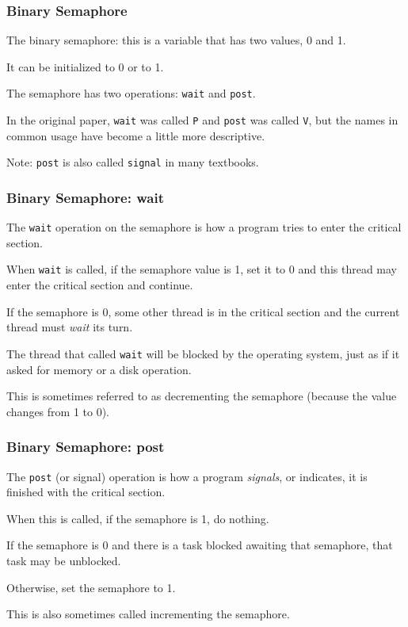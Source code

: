 \begin{frame}
	\frametitle{Binary Semaphore}

	The \alert{binary semaphore}: this is a variable that has two values, 0 and 1.

	It can be initialized to 0 or to 1.

	The semaphore has two operations: \texttt{wait} and \texttt{post}.

	In the original paper, \texttt{wait} was called \texttt{P} and \texttt{post} was called \texttt{V}, but the names in common usage have become a little more descriptive.

	Note: \texttt{post} is also called \texttt{signal} in many textbooks.


\end{frame}

\begin{frame}
	\frametitle{Binary Semaphore: wait}

	The \texttt{wait} operation on the semaphore is how a program tries to enter the critical section.

	When \texttt{wait} is called, if the semaphore value is 1, set it to 0 and this thread may enter the critical section and continue.

	If the semaphore is 0, some other thread is in the critical section and the current thread must \textit{wait} its turn.

	The thread that called \texttt{wait} will be blocked by the operating system, just as if it asked for memory or a disk operation.

	This is sometimes referred to as decrementing the semaphore (because the value changes from 1 to 0).

\end{frame}

\begin{frame}
	\frametitle{Binary Semaphore: post}

	The \texttt{post} (or signal) operation is how a program \textit{signals}, or indicates, it is finished with the critical section.

	When this is called, if the semaphore is 1, do nothing.

	If the semaphore is 0 and there is a task blocked awaiting that semaphore, that task may be unblocked.

	Otherwise, set the semaphore to 1.

	This is also sometimes called incrementing the semaphore.

\end{frame}

